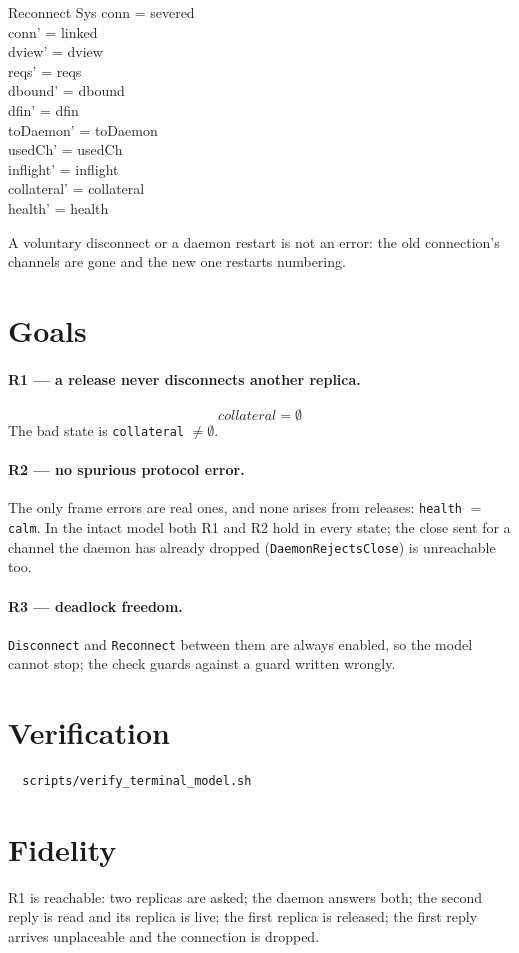 \documentclass[a4paper,10pt,fleqn]{article}
\begin{document}
\begin{schema}{Reconnect}
  \Delta Sys
\where
  conn = severed \\
  conn' = linked \\
  dview' = dview \\
  reqs' = reqs \\
  dbound' = dbound \\
  dfin' = dfin \\
  toDaemon' = toDaemon \\
  usedCh' = usedCh \\
  inflight' = inflight \\
  collateral' = collateral \\
  health' = health
\end{schema}

A voluntary disconnect or a daemon restart is not an error: the old
connection's channels are gone and the new one restarts numbering.

\section{Goals}

\paragraph{R1 --- a release never disconnects another replica.}
\[
  collateral = \emptyset
\]
The bad state is \texttt{collateral} $\neq \emptyset$.

\paragraph{R2 --- no spurious protocol error.}
The only frame errors are real ones, and none arises from releases:
\texttt{health} $= $ \texttt{calm}.  In the intact model both R1 and R2
hold in every state; the close sent for a channel the daemon has already
dropped (\texttt{DaemonRejectsClose}) is unreachable too.

\paragraph{R3 --- deadlock freedom.}
\texttt{Disconnect} and \texttt{Reconnect} between them are always enabled, so
the model cannot stop; the check guards against a guard written wrongly.

\section{Verification}

\begin{verbatim}
  scripts/verify_terminal_model.sh
\end{verbatim}

\section{Fidelity}

R1 is reachable: two replicas are asked; the daemon answers both; the second reply is read and its replica is live; the first replica is released; the first reply arrives unplaceable and the connection is dropped.
\end{document}
